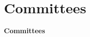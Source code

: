 \documentclass[
letterpaper, %
11pt, %
onecolumn, %
openany, %
]{article}
\begin{document}
                                                     

\cleardoublepage
\section{Committees} 
\pagestyle{plain}
\noindent\textbf{\Huge Committees}
\newline

 







\end{document}
